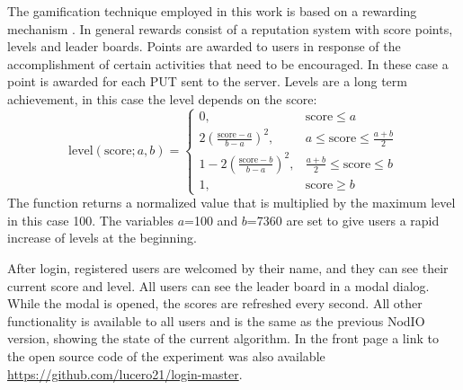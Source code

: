 \documentclass{llncs}
\begin{document}
The gamification technique employed in this work is based on a rewarding mechanism
\cite{dubois2013understanding}. In general rewards  consist of a reputation system
with score points, levels and leader boards. Points are awarded to users in response of
the accomplishment of certain activities that need to be encouraged. In these case
a point is awarded for each PUT sent to the server. Levels are a long
term achievement, in this case the level depends on the score:
\[ \text{level}(\text{score};a,b)=
    \begin{cases}
      0,                                    &  \text{score}\leq a\\
      2(\frac{\text{score}-a}{b-a})^{2},    &  a\leq \text{score}\leq \frac{a+b}{2}\\
      1-2(\frac{\text{score}-b}{b-a})^{2},  & \frac{a+b}{2} \leq \text{score}\leq b\\
      1,                                    & \text{score}\geq b
   \end{cases}
\]
The function returns a normalized value that is multiplied by the maximum level
in this case 100. The variables $a$=100 and $b$=7360 are set to give users a rapid increase of
levels at the beginning.%
%

After login, registered users are welcomed by their name, and they can see
their current score and level. All users can see the 
leader board in a modal dialog.
While the modal is opened, the scores are refreshed every second. All other
functionality is available to all users and is the same as the
previous {\sf NodIO} version, showing the state of the current algorithm.
In the front page a link to the open source code of the experiment was also
available \url{https://github.com/lucero21/login-master}.
\end{document}
